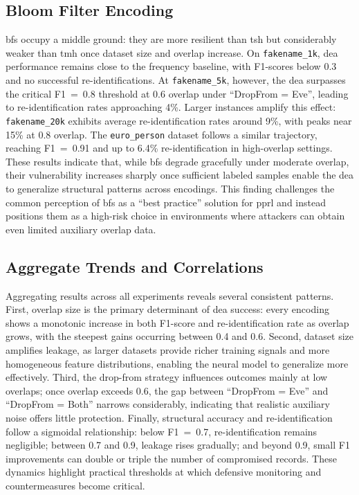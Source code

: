 \documentclass[a4paper,11pt]{scrartcl}
\begin{document}
\subsection{Bloom Filter Encoding}

\ac{bf}s occupy a middle ground: they are more resilient than \ac{tsh} but considerably weaker than \ac{tmh} once dataset size and overlap increase. 
On \texttt{fakename\_1k}, \ac{dea} performance remains close to the frequency baseline, with F1-scores below 0.3 and no successful re-identifications. 
At \texttt{fakename\_5k}, however, the \ac{dea} surpasses the critical F1~=~0.8 threshold at 0.6 overlap under ``DropFrom = Eve'', leading to re-identification rates approaching 4\%. 
Larger instances amplify this effect: \texttt{fakename\_20k} exhibits average re-identification rates around 9\%, with peaks near 15\% at 0.8 overlap. 
The \texttt{euro\_person} dataset follows a similar trajectory, reaching F1~=~0.91 and up to 6.4\% re-identification in high-overlap settings. 
These results indicate that, while \ac{bf}s degrade gracefully under moderate overlap, their vulnerability increases sharply once sufficient labeled samples enable the \ac{dea} to generalize structural patterns across encodings. 
This finding challenges the common perception of \ac{bf}s as a ``best practice'' solution for \ac{pprl} and instead positions them as a high-risk choice in environments where attackers can obtain even limited auxiliary overlap data.


\subsection{Aggregate Trends and Correlations}
Aggregating results across all experiments reveals several consistent patterns. 
First, overlap size is the primary determinant of \ac{dea} success: every encoding shows a monotonic increase in both F1-score and re-identification rate as overlap grows, with the steepest gains occurring between 0.4 and 0.6. 
Second, dataset size amplifies leakage, as larger datasets provide richer training signals and more homogeneous feature distributions, enabling the neural model to generalize more effectively. 
Third, the drop-from strategy influences outcomes mainly at low overlaps; once overlap exceeds 0.6, the gap between ``DropFrom = Eve'' and ``DropFrom = Both'' narrows considerably, indicating that realistic auxiliary noise offers little protection. 
Finally, structural accuracy and re-identification follow a sigmoidal relationship: below F1~=~0.7, re-identification remains negligible; between 0.7 and 0.9, leakage rises gradually; and beyond 0.9, small F1 improvements can double or triple the number of compromised records. 
These dynamics highlight practical thresholds at which defensive monitoring and countermeasures become critical.
\end{document}
